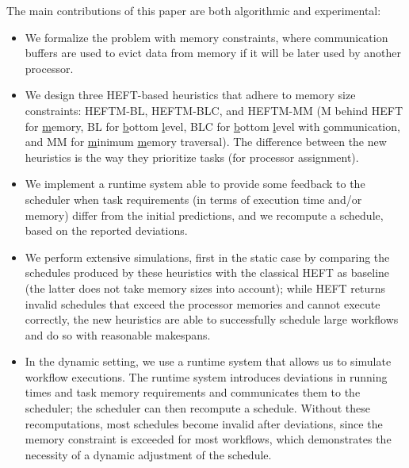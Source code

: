 \documentclass[conference]{IEEEtran}
\newcommand{\algo}[1]{\textsc{#1}}
\newcommand{\heftmm}{\algo{HEFTM-MM}\xspace}
\newcommand{\heftbl}{\algo{HEFTM-BL}\xspace}
\newcommand{\heftblc}{\algo{HEFTM-BLC}\xspace}
\newcommand{\hmey}[1]{{\color{red}[HM: #1]}}
\begin{document}
The main contributions of this paper are both algorithmic and experimental:
\begin{itemize}
\item We formalize the problem with memory constraints, where communication buffers
are used to evict data from memory if it will be later used by another processor. 
\item We design three HEFT-based heuristics
that adhere to memory size constraints: \heftbl, \heftblc, and \heftmm
(M behind HEFT for \underline{m}emory, BL for \underline{b}ottom \underline{l}evel,
BLC for \underline{b}ottom \underline{l}evel with \underline{c}ommunication, 
and MM for \underline{m}inimum \underline{m}emory traversal).
The difference between the new heuristics is the way they prioritize tasks (for processor assignment).

\item We implement a runtime system able to provide some feedback to the scheduler
when task requirements (in terms of execution time and/or memory) differ from the initial predictions, 
and we recompute a schedule, based on the reported deviations. 

\item We perform extensive simulations, first in the static case by comparing the schedules produced 
by these heuristics with the classical HEFT as baseline (the latter does not take memory sizes into account); 
while HEFT returns invalid schedules that exceed the processor memories and cannot execute correctly,
the new heuristics are able to successfully schedule large workflows and do so with reasonable makespans.

\item In the dynamic setting, we use a runtime system that allows us to simulate workflow executions.
The runtime system introduces deviations in running times and task memory requirements and communicates
them to the scheduler; the scheduler can then recompute a schedule. Without these recomputations,
most schedules become invalid after deviations, since the memory constraint is exceeded 
for most workflows, which demonstrates the necessity of a dynamic adjustment of the schedule. 


\end{itemize}
\end{document}
